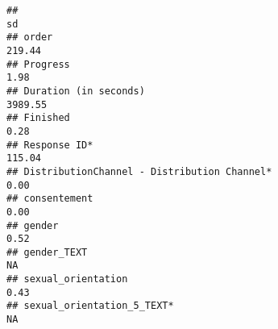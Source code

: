 \documentclass[
]{article}
\begin{document}
\begin{verbatim}
##                                                                                                                                                                                                                                 sd
## order                                                                                                                                                                                                                       219.44
## Progress                                                                                                                                                                                                                      1.98
## Duration (in seconds)                                                                                                                                                                                                      3989.55
## Finished                                                                                                                                                                                                                      0.28
## Response ID*                                                                                                                                                                                                                115.04
## DistributionChannel - Distribution Channel*                                                                                                                                                                                   0.00
## consentement                                                                                                                                                                                                                  0.00
## gender                                                                                                                                                                                                                        0.52
## gender_TEXT                                                                                                                                                                                                                     NA
## sexual_orientation                                                                                                                                                                                                            0.43
## sexual_orientation_5_TEXT*                                                                                                                                                                                                      NA

\end{verbatim}
\end{document}
